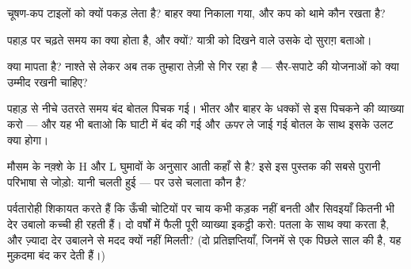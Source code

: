 \begin{exercise}[$\star$]\label{exo:g5:air-pressure-weather:6}
चूषण-कप टाइलों को क्यों पकड़ लेता है? बाहर क्या निकाला गया, और कप को
थामे कौन रखता है?
\end{exercise}

\begin{exercise}[$\star$]\label{exo:g5:air-pressure-weather:7}
पहाड़ पर चढ़ते समय  का क्या होता है, और क्यों? यात्री को दिखने
वाले उसके दो सुराग़ बताओ।
\end{exercise}

\begin{exercise}[$\star$]\label{exo:g5:air-pressure-weather:8}
 क्या मापता है? नाश्ते से लेकर अब तक तुम्हारा  तेज़ी से
गिर रहा है --- सैर-सपाटे की योजनाओं को क्या उम्मीद रखनी चाहिए?
\end{exercise}

\begin{exercise}[$\star\star$]\label{exo:g5:air-pressure-weather:9}
पहाड़ से नीचे उतरते समय बंद बोतल पिचक गई। भीतर और बाहर के धक्कों से
इस पिचकने की व्याख्या करो --- और यह भी बताओ कि घाटी में बंद की गई और
\emph{ऊपर} ले जाई गई बोतल के साथ इसके उलट क्या होगा।
\end{exercise}

\begin{exercise}[$\star\star$]\label{exo:g5:air-pressure-weather:10}
मौसम के नक़्शे के H और L घुमावों के अनुसार  आती कहाँ से है? इसे इस
पुस्तक की सबसे पुरानी परिभाषा से जोड़ो:  यानी चलती हुई  ---
पर उसे चलाता कौन है?
\end{exercise}

\begin{exercise}[$\star\star$]\label{exo:g5:air-pressure-weather:11}
पर्वतारोही शिकायत करते हैं कि ऊँची चोटियों पर चाय कभी कड़क नहीं बनती
और सिवइयाँ कितनी भी देर उबालो कच्ची ही रहती हैं। दो वर्षों में फैली
पूरी व्याख्या इकट्ठी करो: पतला   के साथ क्या करता है,
और ज़्यादा देर उबालने से मदद क्यों नहीं मिलती? (दो प्रतिज्ञप्तियाँ,
जिनमें से एक पिछले साल की है, यह मुक़दमा बंद कर देती हैं।)
\end{exercise}
